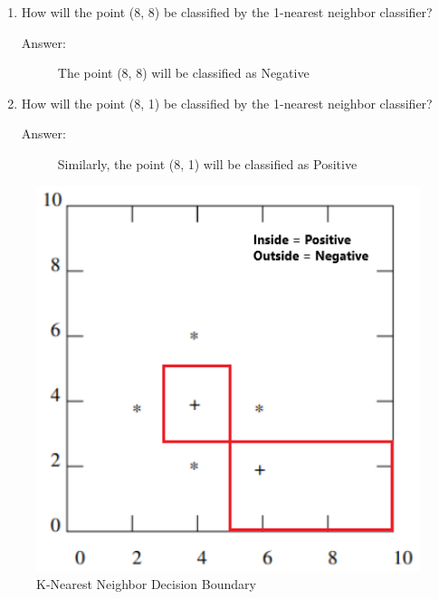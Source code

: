 \documentclass[a4paper,12pt]{article}
\begin{document}
\begin{enumerate}
    \item How will the point (8, 8) be classified by the 1-nearest neighbor classifier?
    \begin{description}
        \item[Answer:] The point (8, 8) will be classified as Negative
        \end{description}
    \item How will the point (8, 1) be classified by the 1-nearest neighbor classifier?
    \begin{description}
        \item[Answer:] Similarly, the point (8, 1) will be classified as Positive 
        \end{description}
\end{enumerate}
\begin{figure}[H]
    \centering
    \includegraphics[width=1\textwidth]{q4.png}
    \caption{K-Nearest Neighbor Decision Boundary}
    \label{fig:knn_decision_boundary}
    
\end{figure}

\newpage
\end{document}
